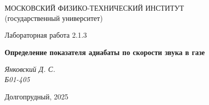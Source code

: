 \thispagestyle{empty}

\begin{center}
    МОСКОВСКИЙ ФИЗИКО-ТЕХНИЧЕСКИЙ ИНСТИТУТ \\
    (государственный университет)
\end{center}

\vfill

\begin{center}
    Лабораторная работа 2.1.3 \\ 
    \vspace{20pt}
    
    \textbf{Определение показателя адиабаты по скорости звука в газе} \\
\end{center}  

\begin{center}
    \textit{Янковский Д. С.} \\
    \textit{Б01-405} \\
\end{center}  

\vfill

\begin{center}
    Долгопрудный, 2025
\end{center}